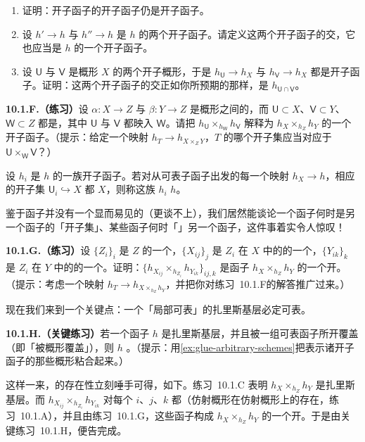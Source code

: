 \begin{exercise}\label{ex:open-subfunctor-geometry}
\begin{enumerate}[label=(\alph*)]
  \item 证明：开子函子的开子函子仍是开子函子。
  \item 设 $h'\to h$ 与 $h''\to h$ 是 $h$ 的两个开子函子。请定义这两个开子函子的交，它也应当是 $h$ 的一个开子函子。
  \item 设 $\mathsf{U}$ 与 $\mathsf{V}$ 是概形 $X$ 的两个开子概形，于是 $h_{\mathsf{U}}\to h_X$ 与 $h_{\mathsf{V}}\to h_X$ 都是开子函子。证明：这两个开子函子的交正如你所预期的那样，是 $h_{\mathsf{U}\cap\mathsf{V}}$。
\end{enumerate}
\end{exercise}

\textbf{10.1.F.（练习）}\quad 设 $\alpha\colon X\to Z$ 与 $\beta\colon Y\to Z$ 是概形之间的\trMorphism，而 $\mathsf{U}\subset X$、$\mathsf{V}\subset Y$、$\mathsf{W}\subset Z$ 都是\trOpenEmbedding，其中 $\mathsf{U}$ 与 $\mathsf{V}$ 都映入 $\mathsf{W}$。请把 $h_{\mathsf{U}}\times_{h_{\mathsf{W}}}h_{\mathsf{V}}$ 解释为 $h_X\times_{h_Z}h_Y$ 的一个开子函子。（提示：给定一个映射 $h_T\to h_{X\times_Z Y}$，$T$ 的哪个开子集应当对应于 $\mathsf{U}\times_{\mathsf{W}}\mathsf{V}$？）

设 $h_i$ 是 $h$ 的一族开子函子。若对从可表子函子出发的每一个映射 $h_X\to h$，相应的开子集 $\mathsf{U}_i\hookrightarrow X$ 都\trCover{} $X$，则称这族 $h_i$ \textbf{\trCover} $h$。

鉴于函子并没有一个显而易见的\trUnderlyingSet（更谈不上\trTopology），我们居然能谈论一个函子何时是另一个函子的「开子集」、某些函子何时「\trCover」另一个函子，这件事着实令人惊叹！

\textbf{10.1.G.（练习）}\quad 设 $\{Z_i\}_i$ 是 $Z$ 的一个\trAffine\trCover，$\{X_{ij}\}_j$ 是 $Z_i$ 在 $X$ 中的\trInverseImage{}的一个\trAffine\trCover，$\{Y_{ik}\}_k$ 是 $Z_i$ 在 $Y$ 中的\trInverseImage{}的一个\trAffine\trCover。证明：$\{h_{X_{ij}}\times_{h_{Z_i}}h_{Y_{ik}}\}_{ij,k}$ 是函子 $h_X\times_{h_Z}h_Y$ 的一个开\trCover。（提示：考虑一个映射 $h_T\to h_{X\times_{h_Z}h_Y}$，并把你对\mbox{练习~10.1.F}的解答推广过来。）

现在我们来到一个关键点：一个「局部可表」的扎里斯基层必定可表。

\textbf{10.1.H.（关键练习）}\quad 若一个函子 $h$ 是扎里斯基层，并且被一组可表函子所开覆盖（即「被概形覆盖」），则 $h$ \trRepresentable。（提示：用\cref{ex:glue-arbitrary-schemes}把表示诸开子函子的那些概形粘合起来。）

这样一来，\trFiberProduct{}的存在性立刻唾手可得，如下。\mbox{练习~10.1.C} 表明 $h_X\times_{h_Z}h_Y$ 是扎里斯基层。而 $h_{X_{ij}}\times_{h_{Z_i}}h_{Y_{ik}}$ 对每个 $i$、$j$、$k$ 都\trRepresentable（仿射概形在仿射概形上的\trFiberProduct{}存在，\mbox{练习~10.1.A}），并且由\mbox{练习~10.1.G}，这些函子构成 $h_X\times_{h_Z}h_Y$ 的一个开\trCover。于是由\mbox{关键练习~10.1.H}，便告完成。
